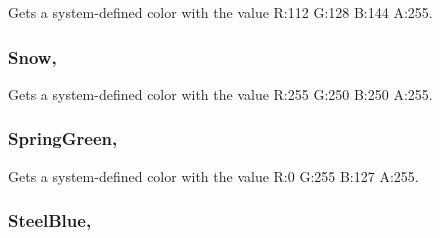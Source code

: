 Gets a system-\/defined color with the value R\+:112 G\+:128 B\+:144 A\+:255.

\hypertarget{structMicrosoft_1_1Xna_1_1Framework_1_1Color_a1d6e122b3cf6f2f9f0a938d7cca90b35}{}
\subsubsection[{Snow}]{ Snow\hspace{0.3cm}{\ttfamily [static]}, {\ttfamily [get]}}\label{structMicrosoft_1_1Xna_1_1Framework_1_1Color_a1d6e122b3cf6f2f9f0a938d7cca90b35}


Gets a system-\/defined color with the value R\+:255 G\+:250 B\+:250 A\+:255.

\hypertarget{structMicrosoft_1_1Xna_1_1Framework_1_1Color_acffb92f90662fbdbda991d007007e3b9}{}
\subsubsection[{Spring\+Green}]{ Spring\+Green\hspace{0.3cm}{\ttfamily [static]}, {\ttfamily [get]}}\label{structMicrosoft_1_1Xna_1_1Framework_1_1Color_acffb92f90662fbdbda991d007007e3b9}


Gets a system-\/defined color with the value R\+:0 G\+:255 B\+:127 A\+:255.

\hypertarget{structMicrosoft_1_1Xna_1_1Framework_1_1Color_a305f27f14c294ea48e4f96c66c3b4505}{}
\subsubsection[{Steel\+Blue}]{ Steel\+Blue\hspace{0.3cm}{\ttfamily [static]}, {\ttfamily [get]}}\label{structMicrosoft_1_1Xna_1_1Framework_1_1Color_a305f27f14c294ea48e4f96c66c3b4505}


